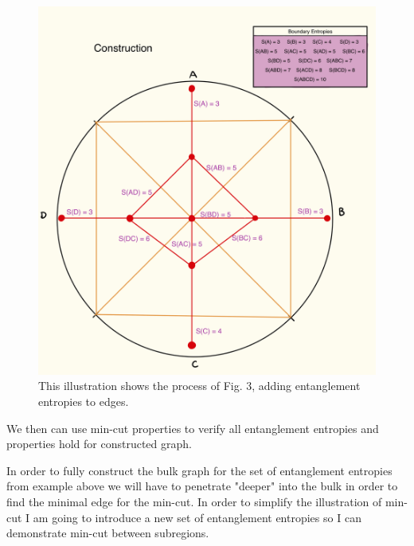 \documentclass[12pt]{article}
\begin{document}
    \begin{figure}[htbp]
        \centering
        \includegraphics[width=\textwidth]{construction.jpeg}  
        \caption{This illustration shows the process of Fig. 3, adding entanglement entropies to edges.}  
        \label{fig:construction}  
    \end{figure}

\newpage 

We then can use min-cut properties to verify all entanglement entropies and properties hold for constructed graph.

In order to fully construct the bulk graph for the set of entanglement entropies from example above we will have to penetrate "deeper" into the bulk in order to find the minimal edge for the min-cut. In order to simplify the illustration of min-cut I am going to introduce a new set of entanglement entropies so I can demonstrate min-cut between subregions.
\end{document}

